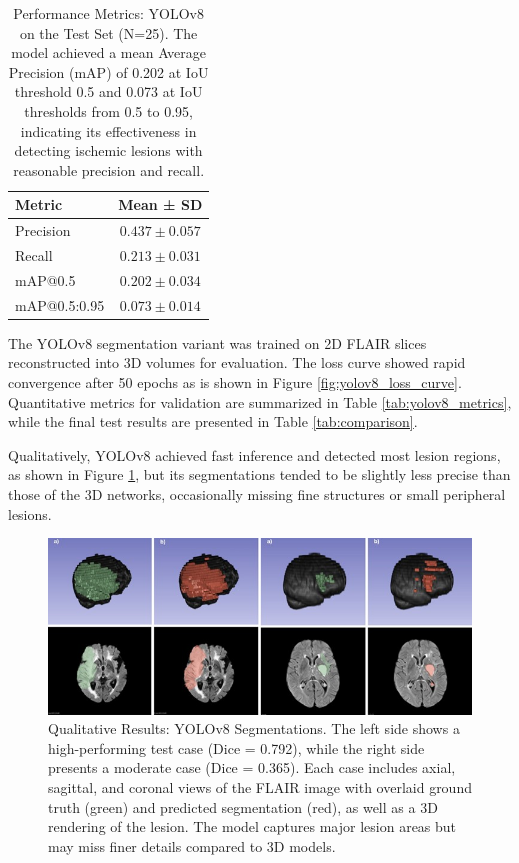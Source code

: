 \documentclass[12pt]{article}
\begin{document}
\begin{table}[tp]
\centering
\begin{tabular}{lc}
\toprule
\textbf{Metric} & \textbf{Mean ± SD} \\
\midrule
Precision & $0.437 \pm 0.057$ \\
Recall & $0.213 \pm 0.031$ \\
mAP@0.5 & $0.202 \pm 0.034$ \\
mAP@0.5:0.95 & $0.073 \pm 0.014$ \\
\bottomrule
\end{tabular}
\caption{Performance Metrics: YOLOv8 on the Test Set (N=25). The model achieved a mean Average Precision (mAP) of 0.202 at IoU threshold 0.5 and 0.073 at IoU thresholds from 0.5 to 0.95, indicating its effectiveness in detecting ischemic lesions with reasonable precision and recall.}
\label{tab:yolov8_detection_metrics}
\end{table}

The YOLOv8 segmentation variant was trained on 2D FLAIR slices reconstructed into 3D volumes for evaluation. The loss curve showed rapid convergence after 50 epochs as is shown in Figure \ref{fig:yolov8_loss_curve}. Quantitative metrics for validation are summarized in Table \ref{tab:yolov8_metrics}, while the final test results are presented in Table \ref{tab:comparison}.

Qualitatively, YOLOv8 achieved fast inference and detected most lesion regions, as shown in Figure \ref{fig:yolov8_qualitative}, but its segmentations tended to be slightly less precise than those of the 3D networks, occasionally missing fine structures or small peripheral lesions.

\begin{figure}[tp]
    \centering
    \includegraphics[width=\textwidth]{figures/Figure 6.jpg}
    \caption{Qualitative Results: YOLOv8 Segmentations. The left side shows a high-performing test case (Dice = 0.792), while the right side presents a moderate case (Dice = 0.365). Each case includes axial, sagittal, and coronal views of the FLAIR image with overlaid ground truth (green) and predicted segmentation (red), as well as a 3D rendering of the lesion. The model captures major lesion areas but may miss finer details compared to 3D models.}
    \label{fig:yolov8_qualitative}
\end{figure}
\end{document}

